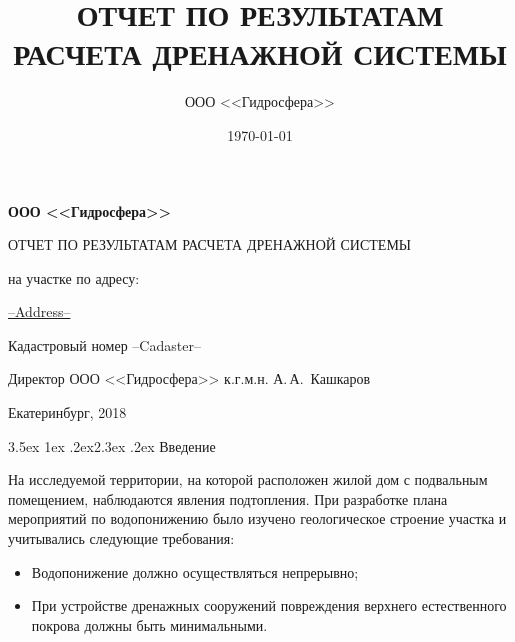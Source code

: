 \documentclass[a4paper,12pt]{article} %
\author{ООО <<Гидросфера>>}\label{company}
\title{ОТЧЕТ ПО РЕЗУЛЬТАТАМ РАСЧЕТА ДРЕНАЖНОЙ СИСТЕМЫ}
\date{\today}
\makeatletter
\renewcommand\section{\@startsection {section}{1}{\parindent}%
	{3.5ex \@plus 1ex \@minus .2ex}{2.3ex \@plus.2ex}%
	{\normalfont\hyphenpenalty=10000\Large\bfseries}}
\newcommand{\txtExecutor}{ООО <<Гидросфера>>}	%
\newcommand{\txtYear}{2018}						%
\newcommand{\txtAddress}{--Address--}			%
\newcommand{\txtCadaster}{--Cadaster--} 		%
\makeatother
\begin{document}

\setlength{\extrarowheight}{1mm} %


\begin{titlepage}
	\begin{center}
		\textbf{\txtExecutor}
		\vspace{5.5cm}
		
		{\LARGE ОТЧЕТ ПО РЕЗУЛЬТАТАМ РАСЧЕТА ДРЕНАЖНОЙ СИСТЕМЫ}
		\vspace{0.25cm}
		
		\bigskip
		
		на участке по адресу:
				
		\underline{\txtAddress}
		
		\bigskip
		Кадастровый номер \txtCadaster
		
		\vfill
	
		\bigskip
		
	\end{center}

	\vfill
	
	\newlength{\ML}
	\hfill
	\begin{minipage}{1.0\textwidth}
		Директор ООО <<Гидросфера>> к.г.м.н.
		\underline{\hspace{\ML}} А.\,А.~Кашкаров\\
	\end{minipage}%
	
	\bigskip
	
	\vfill
	\begin{center}
		Екатеринбург, \txtYear
	\end{center}			

	\end{titlepage}


\section{Введение}

На исследуемой территории, на которой расположен жилой дом с подвальным помещением, наблюдаются явления подтопления. При разработке плана мероприятий по водопонижению было изучено геологическое строение участка и учитывались следующие требования:
\begin{itemize}
\item Водопонижение должно осуществляться непрерывно;
\item При устройстве дренажных сооружений повреждения верхнего естественного покрова должны быть минимальными.
\end{itemize}
\end{document}
